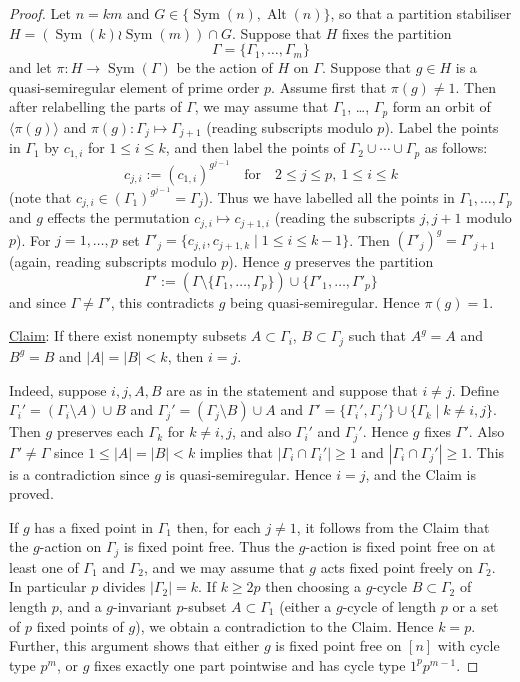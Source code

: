 \documentclass{article}
\theoremstyle{remark}
\theoremstyle{definition}
\DeclareMathOperator{\Alt}{Alt}
\DeclareMathOperator{\Sym}{Sym}
\newcommand{\qsr}{quasi-semiregular}
\newcommand{\qsre}{quasi-semiregular element}
\begin{document}
\begin{proof}
Let  $n=km$ and $G\in\{\Sym(n), \Alt(n)\}$, so that a partition stabiliser $H = (\Sym(k) \wr \Sym(m)) \cap G$. 
Suppose that $H$ fixes the partition
$$\Gamma = \{ \Gamma_1,\ldots, \Gamma_m \}$$
and let $\pi :H \rightarrow \Sym(\Gamma)$ be the action of $H$ on $\Gamma$. Suppose that $g\in H$ is a {\qsre} of prime order $p$. Assume first  that $\pi(g) \neq 1$. Then after relabelling the parts of $\Gamma$, we may assume that $\Gamma_1$, \ldots, $\Gamma_p$ form an orbit of $\langle \pi(g)\rangle$  and $\pi(g) : \Gamma_j \mapsto \Gamma_{j+1}$ (reading subscripts modulo $p$). Label the points in $\Gamma_1$ by $c_{1,i}$ for $1\leqslant i \leqslant k$, and then label the points of $\Gamma_2\cup \cdots \cup \Gamma_p$ as follows:
\[
c_{j,i} := (c_{1,i})^{g^{j-1}} \quad \text{for} \quad 2 \leqslant j \leqslant p, \ 1\leqslant i\leqslant k
\]
  (note that $c_{j,i} \in (\Gamma_1)^{g^{j-1}}=\Gamma_j$). Thus we have labelled all the points in $\Gamma_1,\ldots,\Gamma_p$ and $g$ effects the permutation $c_{j,i} \mapsto c_{j+1,i}$ (reading the subscripts $j, j+1$ modulo $p$). For $j=1,\ldots,p$ set  $\Gamma'_j = \{ c_{j,i} , c_{j+1,k} \mid 1 \leqslant i \leqslant k-1 \}$. Then $(\Gamma'_j)^g = \Gamma'_{j+1}$ (again, reading subscripts modulo $p$). Hence $g$ preserves the partition $$\Gamma ' := \left(\Gamma \setminus \{\Gamma_1,\ldots,\Gamma_p\} \right)\cup \{\Gamma'_1,\ldots,\Gamma'_p\}$$
and since $\Gamma\neq \Gamma'$, this contradicts $g$ being {\qsr}. Hence $\pi(g)=1$. 

\medskip
\noindent \underline{Claim}:  If  there exist nonempty subsets $A\subset \Gamma_i$, $B \subset  \Gamma_j$ such that $A^g = A$ and $B^g=B$ and $|A|=|B| < k$, then $i=j$.

Indeed, suppose $i,j,A,B$ are as in the statement and suppose that $i\ne j$. Define $\Gamma_i' = (\Gamma_i\setminus A) \cup B$ and $\Gamma_j'= (\Gamma_j \setminus B) \cup A$ and $\Gamma' = \{ \Gamma_i',\Gamma_j'\}\cup  \{\Gamma_k \mid k\neq i, j\}$. Then $g$ preserves each $\Gamma_k$ for $k\neq i, j$, and also $\Gamma_i'$ and $\Gamma_j'$. Hence $g$ fixes $\Gamma'$. Also  $\Gamma'\ne \Gamma$ since  $1\leqslant|A|=|B|<k$ implies that $|\Gamma_i\cap \Gamma_i'|\geqslant1$ and $|\Gamma_i \cap \Gamma_j'|\geqslant1$. This is a contradiction since $g$ is {\qsr}.  Hence $i=j$, and the Claim is proved.




\medskip
If $g$ has a fixed point in $\Gamma_1$ then, for each $j\ne 1$, it follows from the Claim that the $g$-action on $\Gamma_j$ is fixed point free.  Thus the $g$-action is fixed point free on at least one of $\Gamma_1$ and $\Gamma_2$, and we may assume that $g$ acts fixed point freely on $\Gamma_2$.     In particular $p$ divides $|\Gamma_2|=k$.   If $k\geqslant 2p$ then choosing a $g$-cycle $B\subset \Gamma_2$ of length $p$, and a $g$-invariant $p$-subset $A\subset \Gamma_1$ (either a $g$-cycle of length $p$ or a set of $p$ fixed points of $g$), we obtain a contradiction to the Claim. Hence $k=p$. Further, this argument shows that either $g$ is fixed point free on $[n]$ with cycle type $p^m$, or  $g$ fixes exactly one part pointwise and has cycle type $1^pp^{m-1}$. 






\end{proof}
\end{document}
